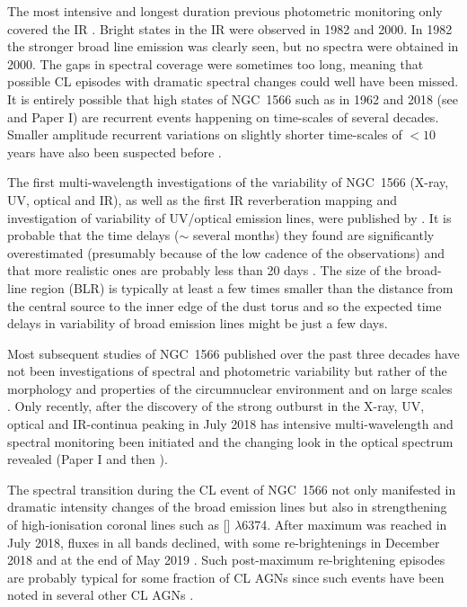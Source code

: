 \documentclass[fleqn,usenatbib]{mnras}
\begin{document}
 The most intensive and longest duration previous photometric monitoring only covered the IR \citep[\textit{JHK};][]{Glass2004}. Bright states in the IR were observed in 1982 and 2000. In 1982 the stronger broad line emission was clearly seen, but no spectra were obtained in 2000. The gaps in spectral coverage were sometimes too long, meaning that possible CL episodes with dramatic spectral changes could well have been missed. It is entirely possible that high states of NGC~1566 such as in 1962 \citep{Shobbrook1966, Pastoriza1970} and 2018 (see \citealt{Oknyansky2018b} and Paper I) are recurrent events happening on time-scales of several decades. Smaller amplitude recurrent variations on slightly shorter time-scales of $<10$ years have also been suspected before \citep{Alloin1986}.

The first multi-wavelength investigations of the variability of NGC~1566  (X-ray, UV, optical and IR), as well as the first IR reverberation mapping and investigation of variability of UV/optical emission lines, were published by \cite{Baribaud1992}. It is probable that the time delays ($\sim$ several months) they found are significantly overestimated (presumably because of the low cadence of the observations) and that more realistic ones are probably less than 20 days \citep{Oknyansky2001}.  The size of the broad-line region (BLR) is typically at least a few times smaller than the distance from the central source to the inner edge of the dust torus \citep[see e.g., ][]{Netzer2015} and so the expected time delays in variability of broad emission lines might be just a few days.

Most subsequent studies of NGC~1566 published over the past three decades have not been investigations of spectral and photometric variability but rather of the morphology and properties of the circumnuclear environment \citep[see e.g., ][]{Silva2017, Combes2019} and on large scales \citep{Elagali2019}. Only recently, after the discovery of the strong outburst in the X-ray, UV, optical and IR-continua peaking in July 2018 \citep[see details and references in ][]{Oknyansky2019, Parker2019} has intensive  multi-wavelength and spectral monitoring been initiated and the changing look in the optical spectrum revealed (Paper I and then \citealt{Kollatschny2020}).  

The spectral transition during the CL event of NGC~1566 not only manifested in dramatic intensity changes of the broad emission lines but also in strengthening of high-ionisation coronal lines such as [] $\lambda$6374. After maximum was reached in July 2018, fluxes in all bands declined, with some  re-brightenings in December 2018 \citep{Grupe2018b} and at the end of May 2019 \citep{Grupe2019}. Such post-maximum re-brightening episodes are probably typical for some fraction of CL AGNs since such events have been noted in several other CL AGNs  \citep{Oknyansky2017a, Oknyansky2018b, Katebi2018}.
\end{document}
